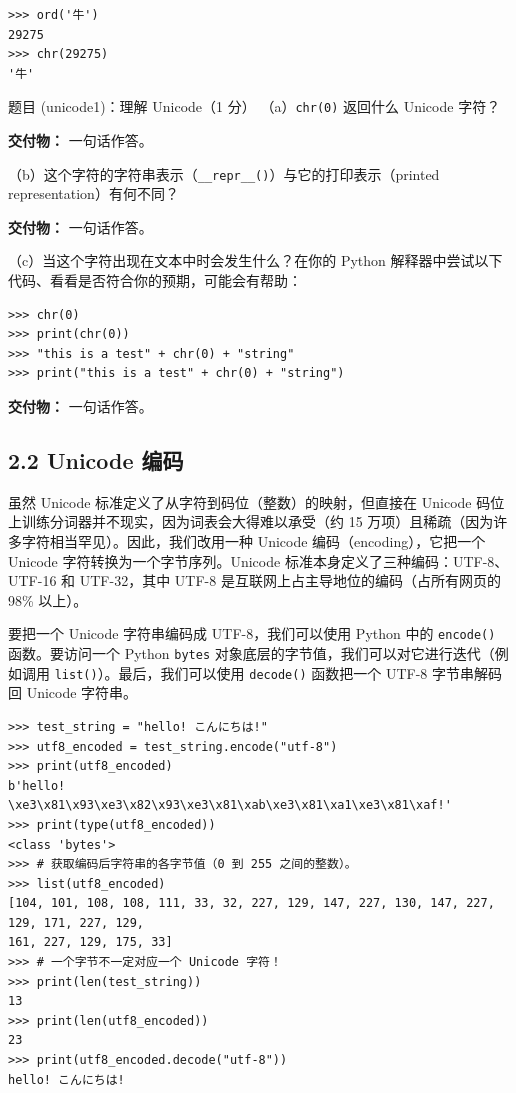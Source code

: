 \begin{lstlisting}
>>> ord('牛')
29275
>>> chr(29275)
'牛'
\end{lstlisting}

\begin{problembox}{题目 (unicode1)：理解 Unicode（1 分）}
（a）\texttt{chr(0)} 返回什么 Unicode 字符？

\textbf{交付物：} 一句话作答。

（b）这个字符的字符串表示（\texttt{\_\_repr\_\_()}）与它的打印表示（printed representation）有何不同？

\textbf{交付物：} 一句话作答。

（c）当这个字符出现在文本中时会发生什么？在你的 Python 解释器中尝试以下代码、看看是否符合你的预期，可能会有帮助：

\begin{lstlisting}
>>> chr(0)
>>> print(chr(0))
>>> "this is a test" + chr(0) + "string"
>>> print("this is a test" + chr(0) + "string")
\end{lstlisting}

\textbf{交付物：} 一句话作答。
\end{problembox}

\subsection*{2.2 Unicode 编码}

虽然 Unicode 标准定义了从字符到码位（整数）的映射，但直接在 Unicode 码位上训练分词器并不现实，因为词表会大得难以承受（约 15 万项）且稀疏（因为许多字符相当罕见）。因此，我们改用一种 Unicode 编码（encoding），它把一个 Unicode 字符转换为一个字节序列。Unicode 标准本身定义了三种编码：UTF-8、UTF-16 和 UTF-32，其中 UTF-8 是互联网上占主导地位的编码（占所有网页的 98\% 以上）。

要把一个 Unicode 字符串编码成 UTF-8，我们可以使用 Python 中的 \texttt{encode()} 函数。要访问一个 Python \texttt{bytes} 对象底层的字节值，我们可以对它进行迭代（例如调用 \texttt{list()}）。最后，我们可以使用 \texttt{decode()} 函数把一个 UTF-8 字节串解码回 Unicode 字符串。

\begin{lstlisting}
>>> test_string = "hello! こんにちは!"
>>> utf8_encoded = test_string.encode("utf-8")
>>> print(utf8_encoded)
b'hello! \xe3\x81\x93\xe3\x82\x93\xe3\x81\xab\xe3\x81\xa1\xe3\x81\xaf!'
>>> print(type(utf8_encoded))
<class 'bytes'>
>>> # 获取编码后字符串的各字节值（0 到 255 之间的整数）。
>>> list(utf8_encoded)
[104, 101, 108, 108, 111, 33, 32, 227, 129, 147, 227, 130, 147, 227, 129, 171, 227, 129,
161, 227, 129, 175, 33]
>>> # 一个字节不一定对应一个 Unicode 字符！
>>> print(len(test_string))
13
>>> print(len(utf8_encoded))
23
>>> print(utf8_encoded.decode("utf-8"))
hello! こんにちは!
\end{lstlisting}


